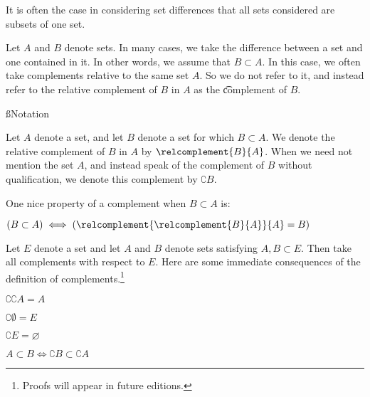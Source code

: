 

It is often the case in considering set differences that all sets considered are subsets of one set.


Let $A$ and $B$ denote sets.
In many cases, we take the difference between a set and one contained in it.
In other words, we assume that $B \subset A$.
In this case, we often take complements relative to the same set $A$.
So we do not refer to it, and instead refer to the relative complement of $B$ in $A$ as the \t{complement} of $B$.

\ss{Notation}

Let $A$ denote a set, and let $B$ denote a set for which $B \subset A$.
We denote the relative complement of $B$ in $A$ by $\relcomplement{B}{A}$.
When we need not mention the set $A$, and instead speak of the complement of $B$ without qualification, we denote this complement by $\complement{B}$.


One nice property of a complement when $B \subset A$ is:
\begin{proposition}
  $(B \subset A) \iff (\relcomplement{\relcomplement{B}{A}}{A} = B)$
\end{proposition}


Let $E$ denote a set and let $A$ and $B$ denote sets satisfying $A,B \subset E$.
Then take all complements with respect to $E$.
Here are some immediate consequences of the definition of complements.\footnote{Proofs will appear in future editions.}

\begin{proposition}
  $\complement{\complement{A}} = A$
\end{proposition}

\begin{proposition}
  $\complement{\emptyset} = E$
\end{proposition}

\begin{proposition}
  $\complement{E} = \varnothing$
\end{proposition}

\begin{proposition}
  $A \subset B \iff \complement{B} \subset \complement{A}$
\end{proposition}
